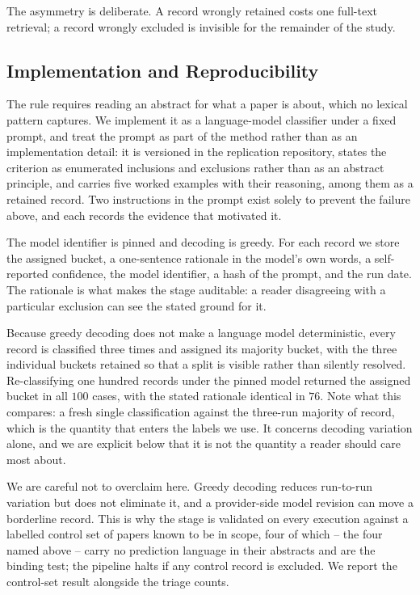 The asymmetry is deliberate. A record wrongly retained costs one full-text retrieval; a record
wrongly excluded is invisible for the remainder of the study.

\subsection{Implementation and Reproducibility}

The rule requires reading an abstract for what a paper is about, which no lexical pattern captures.
We implement it as a language-model classifier under a fixed prompt, and treat the prompt as part of
the method rather than as an implementation detail: it is versioned in the replication repository,
states the criterion as enumerated inclusions and exclusions rather than as an abstract principle,
and carries five worked examples with their reasoning, among them \citet{berthet2020learning} as a
retained record. Two instructions in the prompt exist solely to prevent the failure above, and each
records the evidence that motivated it.

The model identifier is pinned and decoding is greedy. For each record we store the assigned
bucket, a one-sentence rationale in the model's own words, a self-reported confidence, the model
identifier, a hash of the prompt, and the run date. The rationale is what makes the stage auditable:
a reader disagreeing with a particular exclusion can see the stated ground for it.

Because greedy decoding does not make a language model deterministic, every record is classified
three times and assigned its majority bucket, with the three individual buckets retained so that a
split is visible rather than silently resolved. Re-classifying one hundred records under the pinned
model returned the assigned bucket in all \(100\) cases, with the stated rationale identical in
\(76\). Note what this compares: a fresh single classification against the three-run majority of
record, which is the quantity that enters the labels we use. It concerns decoding variation alone,
and we are explicit below that it is not the quantity a reader should care most about.

We are careful not to overclaim here. Greedy decoding reduces run-to-run variation but does not
eliminate it, and a provider-side model revision can move a borderline record. This is why the stage
is validated on every execution against a labelled control set of papers known to be in scope,
four of which -- the four named above -- carry no prediction language in their abstracts and are the
binding test; the pipeline halts if any control record is excluded. We report the control-set result
alongside the triage counts.

